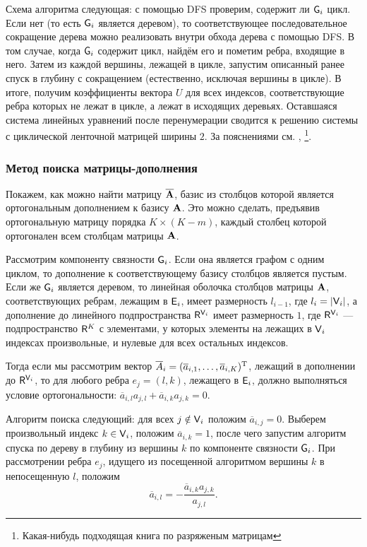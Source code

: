 \documentclass[10pt]{article}
\begin{document}
Схема алгоритма следующая: с помощью DFS проверим, содержит ли $\mathsf{G}_i$ цикл. Если нет (то есть $\mathsf{G}_i$ является деревом), то соответствующее последовательное сокращение дерева можно реализовать внутри обхода дерева с помощью DFS. В том случае, когда $\mathsf{G}_i$ содержит цикл, найдём его и пометим ребра, входящие в него. Затем из каждой вершины, лежащей в цикле, запустим описанный ранее спуск в глубину с сокращением (естественно, исключая вершины в цикле). В итоге, получим коэффициенты вектора $U$ для всех индексов, соответствующие ребра которых не лежат в цикле, а лежат в исходящих деревьях. Оставшаяся система линейных уравнений после перенумерации сводится к решению системы с циклической ленточной матрицей ширины $2$. За пояснениями см. \cite{cormen2009introduction}, \footnote{Какая-нибудь подходящая книга по разряженым матрицам}. %
\subsubsection{Метод поиска матрицы-дополнения}
Покажем, как можно найти матрицу $\overline {\mathbf{A}}$, базис из столбцов которой является ортогональным дополнением к базису $\mathbf{A}$. Это можно сделать, предъявив ортогональную матрицу порядка $K \times (K-m)$, каждый столбец которой ортогонален всем столбцам матрицы $\mathbf{A}$.

Рассмотрим компоненту связности $\mathsf{G}_i$. Если она является графом с одним циклом, то дополнение к соответствующему базису столбцов является пустым. Если же $\mathsf{G}_i$ является деревом, то линейная оболочка столбцов матрицы $\mathbf{A}$, соответствующих ребрам, лежащим в $\mathsf{E}_i$, имеет размерность $l_{i-1}$, где $l_i = | \mathsf{V}_i |$, а дополнение до линейного подпространства $\mathsf{R}^{\mathsf{V}_i}$ имеет размерность $1$, где $\mathsf{R}^{\mathsf{V}_i}$ --- подпространство $\mathsf{R}^K$ с элементами, у которых элементы на лежащих в $\mathsf{V}_i$ индексах произвольные, и нулевые для всех остальных индексов.

Тогда если мы рассмотрим вектор $\overline A_i = (\overline a_{i, 1}, \ldots, \overline a_{i, K})^{\mathrm{T}}$, лежащий в дополнении до $\mathsf{R}^{\mathsf{V}_i}$, то для любого ребра $e_j= (l,k)$, лежащего в $\mathsf{E}_i$, должно выполняться условие ортогональности: $\overline a_{i, l} a_{j, l} + \overline a_{i, k} a_{j, k} = 0$.

Алгоритм поиска следующий: для всех $j \notin \mathsf{V}_i$ положим $\overline a_{i, j} = 0$. Выберем произвольный индекс $k \in \mathsf{V}_i$, положим $\overline a_{i, k} = 1$, после чего запустим алгоритм спуска по дереву в глубину из вершины $k$ по компоненте связности $\mathsf{G}_i$. При рассмотрении ребра $e_j$, идущего из посещенной алгоритмом вершины $k$ в непосещенную $l$, положим
\begin{equation*}
\overline a_{i, l} = -\frac{\overline a_{i, k} a_{j, k}}{a_{j, l}}.
\end{equation*}
\end{document}
